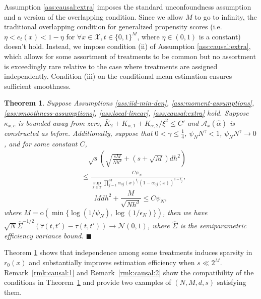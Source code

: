 \documentclass[11pt]{article}
\newtheorem{theorem}{Theorem}
\newcommand{\proofend}{\hfill$\blacksquare$}
\begin{document}
Assumption \ref{ass:causal:extra} imposes the standard unconfoundness assumption and a version of the overlapping condition. Since we allow $M$ to go to infinity, the traditional overlapping condition for generalized propensity scores (i.e. $\eta<e_t(x)<1-\eta$ for $\forall x\in\mathcal{X}, t\in\{0,1\}^M$, where $\eta\in(0,1)$ is a constant) doesn't hold. Instead, we impose condition (ii) of Assumption \ref{ass:causal:extra}, which allows for some assortment of treatments to be common but no assortment is exceedingly rare relative to the case where treatments are assigned independently. Condition (iii) on the conditional mean estimation ensures sufficient smoothness. 
\begin{theorem}\label{thm:causal-inference:AIPW}
Suppose Assumptions \ref{ass:iid-min-den}, \ref{ass:moment-assumptions}, \ref{ass:smoothness-assumptions}, \ref{ass:local-linear}, \ref{ass:causal:extra} hold. Suppose $\kappa_{x,\bar{c}}$ is bounded away from zero, $\bar{K}_2 + K_{\alpha,1} + K_{\alpha,2}/\xi^2\leq C'$ and $\mathcal{A}_x(\hat{\alpha})$ is constructed as before. Additionally, suppose that $0<\gamma\leq\frac{1}{4}$, $\psi_NN^\gamma<1$, $\psi_NN^\gamma\to0$, and for some constant $C$,
\begin{equation}\label{consistency:ATE:condition}
\begin{array}{rl}   
    &\displaystyle\quad\sqrt{s}\left(\sqrt{\frac{sM}{Nh^d}}\!+(s+\sqrt{M})dh^2\right)\\
    &\displaystyle\leq\frac{C\psi_N}{\sup_{x\in\mathcal{X}}\!\prod_{j=1}^M\!\alpha_{0j}(x)^{t_j}(1-\alpha_{0j}(x))^{1-t_j}},
\end{array}
\end{equation} 
\begin{equation}\label{consistency:ATE:2}
Mdh^2+\frac{M}{\sqrt{Nh^d}}\leq C\psi_N,
\end{equation}
where $M=\mathrm{o}(\min\{\log(1/\psi_N),\log(1/\epsilon_N)\})$, then we have $\sqrt{N}\hat \Sigma^{-1/2} (\hat \tau(t,t') - \tau(t,t')) \to\mathcal{N}(0,1)$, where $\hat{\Sigma}$ is the semiparametric efficiency variance bound. \proofend
\end{theorem}
Theorem \ref{thm:causal-inference:AIPW} shows that independence among some treatments induces sparsity in $r_0(x)$ and substantially improves estimation efficiency when $s\ll 2^M$. 
Remark~\ref{rmk:causal:1} and Remark~\ref{rmk:causal:2} show the compatibility of the conditions in Theorem~\ref{thm:causal-inference:AIPW} and provide two examples of $(N,M,d,s)$ satisfying them.
\end{document}
